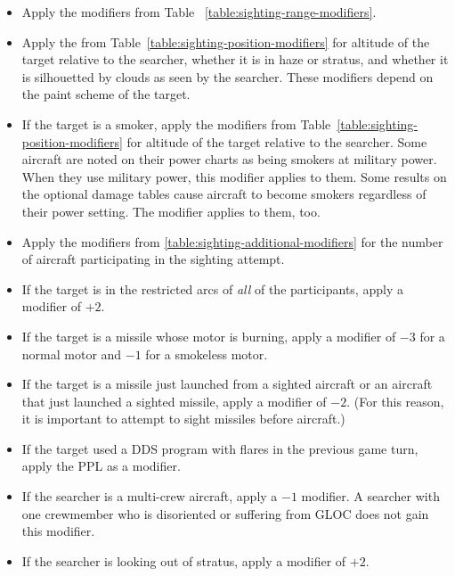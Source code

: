 {\begin{itemize}
    \item {} Apply the modifiers from Table ~\ref{table:sighting-range-modifiers}.
    \item {} Apply the from Table~\ref{table:sighting-position-modifiers} for altitude of the target relative to the searcher, whether it is in haze or stratus, and whether it is silhouetted by clouds as seen by the searcher. These modifiers depend on the paint scheme of the target.
    \item {} If the target is a smoker, apply the modifiers from Table~\ref{table:sighting-position-modifiers} for altitude of the target relative to the searcher. Some aircraft are noted on their power charts as being smokers at military power. When they use military power, this modifier applies to them. Some results on the optional damage tables cause aircraft to become smokers regardless of their power setting. The modifier applies to them, too.
    \item {} Apply the modifiers from \ref{table:sighting-additional-modifiers} for the number of aircraft participating in the sighting attempt. 
    \item {} If the target is in the restricted arcs of \emph{all} of the participants, apply a modifier of $+2$.
    \item {} If the target is a missile whose motor is burning, apply a modifier of $-3$ for a normal motor and $-1$ for a smokeless motor.
    \item {} If the target is a missile just launched from a sighted aircraft or an aircraft that just launched a sighted missile, apply a modifier of $-2$. (For this reason, it is important to attempt to sight missiles before aircraft.)
    \item {} If the target used a DDS program with flares in the previous game turn, apply the PPL as a modifier.
    \item {} If the searcher is a multi-crew aircraft,    
    apply a $-1$ modifier. A searcher with one crewmember who is disoriented or suffering from GLOC does not gain this modifier.
    \item {} If the searcher is looking out of stratus, apply a modifier of $+2$.

\end{itemize}}
